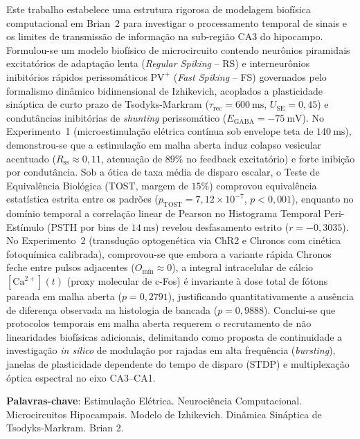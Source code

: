 \documentclass[12pt,openright,oneside,a4paper,brazil]{abntex2}
\begin{document}
\imprimirfolhaderosto

\setlength{\absparsep}{18pt}
\begin{resumo}
    Este trabalho estabelece uma estrutura rigorosa de modelagem biofísica computacional em \textsf{Brian~2} para investigar o processamento temporal de sinais e os limites de transmissão de informação na sub-região CA3 do hipocampo. Formulou-se um modelo biofísico de microcircuito contendo neurônios piramidais excitatórios de adaptação lenta (\textit{Regular Spiking} -- RS) e interneurônios inibitórios rápidos perissomáticos $\text{PV}^+$ (\textit{Fast Spiking} -- FS) governados pelo formalismo dinâmico bidimensional de Izhikevich, acoplados a plasticidade sináptica de curto prazo de Tsodyks-Markram ($\tau_{\text{rec}} = \qty{600}{\milli\second}$, $U_{\text{SE}} = 0{,}45$) e condutâncias inibitórias de \textit{shunting} perissomático ($E_{\text{GABA}} = \qty{-75}{\milli\volt}$). No Experimento~1 (microestimulação elétrica contínua sob envelope teta de $\qty{140}{\milli\second}$), demonstrou-se que a estimulação em malha aberta induz colapso vesicular acentuado ($R_{\text{ss}} \approx 0{,}11$, atenuação de $89\%$ no feedback excitatório) e forte inibição por condutância. Sob a ótica de taxa média de disparo escalar, o Teste de Equivalência Biológica (TOST, margem de $15\%$) comprovou equivalência estatística estrita entre os padrões ($p_{\text{TOST}} = 7{,}12 \times 10^{-7}$, $p < 0{,}001$), enquanto no domínio temporal a correlação linear de Pearson no Histograma Temporal Peri-Estímulo (PSTH por bins de $\qty{14}{\milli\second}$) revelou desfasamento estrito ($r = -0{,}3035$). No Experimento~2 (transdução optogenética via ChR2 e Chronos com cinética fotoquímica calibrada), comprovou-se que embora a variante rápida Chronos feche entre pulsos adjacentes ($O_{\text{mín}} \approx 0$), a integral intracelular de cálcio $[\text{Ca}^{2+}](t)$ (proxy molecular de c-Fos) é invariante à dose total de fótons pareada em malha aberta ($p = 0{,}2791$), justificando quantitativamente a ausência de diferença observada na histologia de bancada ($p = 0{,}9888$). Conclui-se que protocolos temporais em malha aberta requerem o recrutamento de não linearidades biofísicas adicionais, delimitando como proposta de continuidade a investigação \textit{in silico} de modulação por rajadas em alta frequência (\textit{bursting}), janelas de plasticidade dependente do tempo de disparo (STDP) e multiplexação óptica espectral no eixo CA3--CA1.

    \noindent \textbf{Palavras-chave}: Estimulação Elétrica. Neurociência Computacional. Microcircuitos Hipocampais. Modelo de Izhikevich. Dinâmica Sináptica de Tsodyks-Markram. Brian 2.
\end{resumo}
\end{document}
